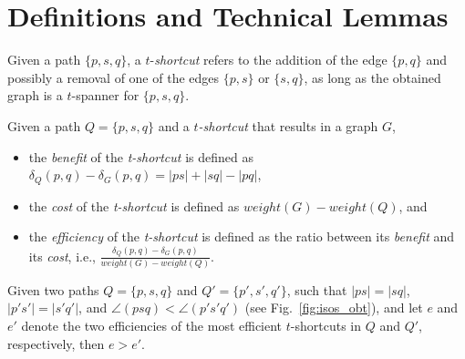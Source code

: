 \documentclass[a4paper]{llncs}
\begin{document}
\section{Definitions and Technical Lemmas}\label{sec:defs}

\begin{definition}
Given a path $\{p,s,q\}$, a $t$-\emph{shortcut} refers to the addition of the edge $\{p,q\}$
and possibly a removal of one of the edges $\{p,s\}$ or $\{s,q\}$,
as long as the obtained graph is a $t$-spanner for $\{p,s,q\}$.
\end{definition}

\begin{definition}\label{def:effi}
Given a path $Q=\{p,s,q\}$ and
a \emph{$t$-shortcut} that results in a graph $G$, 
\begin{itemize}
\item the \emph{benefit} of the \emph{t-shortcut} is defined as $\delta_Q(p,q)-\delta_{G}(p,q)=|ps|+|sq|-|pq|$,
\item the \emph{cost} of the \emph{t-shortcut} is defined as $weight(G)-weight(Q)$, and
\item the \emph{efficiency} of the \emph{t-shortcut} is defined as the ratio between its \emph{benefit} and its \emph{cost},
i.e., $\frac{\delta_Q(p,q)-\delta_{G}(p,q)}{weight(G)-weight(Q)}$.
\end{itemize}
\end{definition}



\begin{lemma}\label{lem:isos}
Given two paths $Q=\{p,s,q\}$ and $Q'=\{p',s',q'\}$, such that $|ps|=|sq|$, $|p's'|=|s'q'|$,
and $\angle(psq)<\angle(p's'q')$ (see Fig.~\ref{fig:isos_obt}), 
and let $e$ and $e'$ denote the two efficiencies of the most efficient $t$-shortcuts in $Q$ and $Q'$, respectively, then $e>e'$.
\end{lemma}
\end{document}
